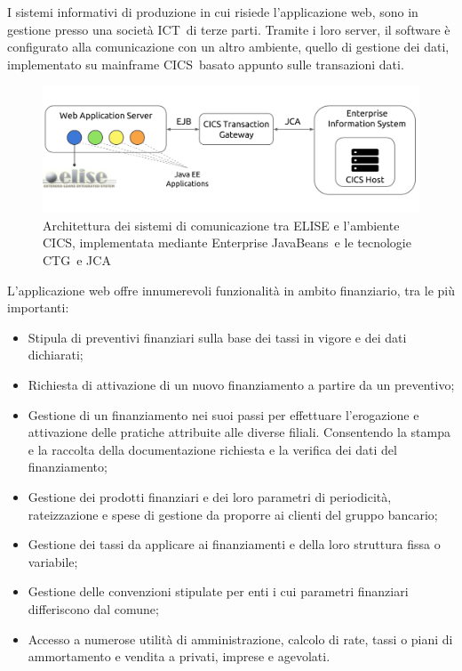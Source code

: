 	I sistemi informativi di produzione in cui risiede l'applicazione web, sono in gestione presso una società ICT\glossario\ di terze parti. Tramite i loro server, il software è configurato alla comunicazione con un altro ambiente, quello di gestione dei dati, implementato su mainframe CICS\glossario\ basato appunto sulle transazioni dati.
	
	\begin{figure}[H]
		\centering
	   	\includegraphics[width=1\textwidth]{immagini/architettura_ELISE}
	   	\caption{Architettura dei sistemi di comunicazione tra ELISE e l'ambiente CICS, implementata mediante Enterprise JavaBeans\glossario\ e le tecnologie CTG\glossario\ e JCA\glossario\ }
	\end{figure}
	
	L'applicazione web offre innumerevoli funzionalità in ambito finanziario, tra le più importanti:
	
	\begin{itemize}
		\item Stipula di preventivi finanziari sulla base dei tassi in vigore e dei dati dichiarati;
		\item Richiesta di attivazione di un nuovo finanziamento a partire da un preventivo; 
		\item Gestione di un finanziamento nei suoi passi per effettuare l'erogazione e attivazione delle pratiche attribuite alle diverse filiali. Consentendo la stampa e la raccolta della documentazione richiesta e la verifica dei dati del finanziamento;
		\item Gestione dei prodotti finanziari e dei loro parametri di periodicità, rateizzazione e spese di gestione da proporre ai clienti del gruppo bancario;
		\item Gestione dei tassi da applicare ai finanziamenti e della loro struttura fissa o variabile;
		\item Gestione delle convenzioni stipulate per enti i cui parametri finanziari differiscono dal comune;
		\item Accesso a numerose utilità di amministrazione, calcolo di rate, tassi o piani di ammortamento e vendita a privati, imprese e agevolati.	
	\end{itemize}
		
